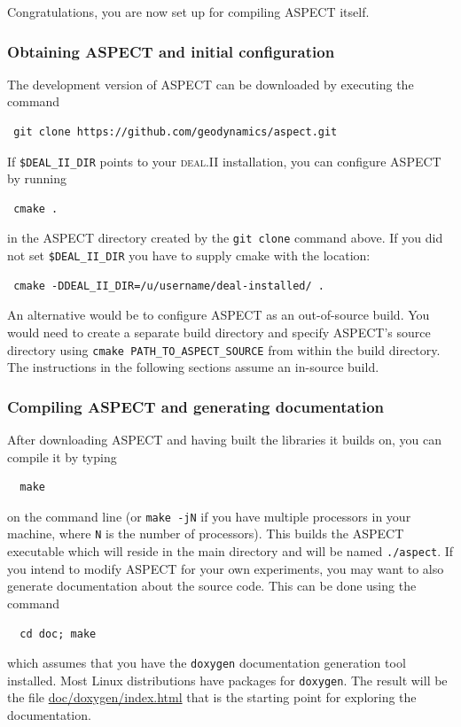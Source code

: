 \documentclass{article}
\newcommand{\dealii}{{\textsc{deal.II}}}
\newcommand{\aspect}{\textsc{ASPECT}}
\begin{document}
Congratulations, you are now set up for compiling \aspect{} itself.

\subsubsection{Obtaining \aspect{} and initial configuration}

The development version of \aspect{} can be downloaded by executing the command
\begin{verbatim}
 git clone https://github.com/geodynamics/aspect.git
\end{verbatim}
If {\texttt{\$DEAL\_II\_DIR}} points to your \dealii{} installation, you can configure
\aspect{} by running
\begin{verbatim}
 cmake .
\end{verbatim}
in the \aspect{} directory created by the {\texttt{git clone}} command above.
If you did not set {\texttt{\$DEAL\_II\_DIR}} you have to supply cmake with the location:
\begin{verbatim}
 cmake -DDEAL_II_DIR=/u/username/deal-installed/ .
\end{verbatim}

An alternative would be to configure \aspect{} as an out-of-source build. 
You would need to create a separate build directory and
specify \aspect{}'s source directory using \texttt{cmake PATH\_TO\_ASPECT\_SOURCE}
from within the build directory. The
instructions in the following sections assume an in-source build.

\subsubsection{Compiling \aspect{} and generating documentation}
\label{sec:compiling}

After downloading \aspect{} and having built the libraries it builds on, you
can compile it by typing
\begin{verbatim}
  make
\end{verbatim}
on the command line (or \texttt{make -jN} if you have multiple processors in
your machine, where \texttt{N} is the number of processors). This builds the
\aspect{} executable which will reside in
the main directory and will be named \texttt{./aspect}. If you intend to
modify \aspect{} for your own experiments, you may want to also generate
documentation about the source code. This can be done using the command
\begin{verbatim}
  cd doc; make
\end{verbatim}
which assumes that you have the \texttt{doxygen} documentation generation tool
installed. Most Linux distributions have packages for \texttt{doxygen}. The
result will be the file \url{doc/doxygen/index.html} that is the starting
point for exploring the documentation.
\end{document}
